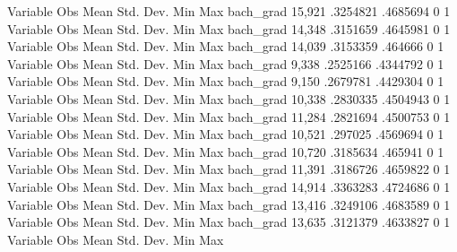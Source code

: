 {\smallskip}
    Variable {\VBAR}        Obs        Mean    Std. Dev.       Min        Max
   bach_grad {\VBAR}     15,921    .3254821    .4685694          0          1
{\smallskip}
    Variable {\VBAR}        Obs        Mean    Std. Dev.       Min        Max
   bach_grad {\VBAR}     14,348    .3151659    .4645981          0          1
{\smallskip}
    Variable {\VBAR}        Obs        Mean    Std. Dev.       Min        Max
   bach_grad {\VBAR}     14,039    .3153359     .464666          0          1
{\smallskip}
    Variable {\VBAR}        Obs        Mean    Std. Dev.       Min        Max
   bach_grad {\VBAR}      9,338    .2525166    .4344792          0          1
{\smallskip}
    Variable {\VBAR}        Obs        Mean    Std. Dev.       Min        Max
   bach_grad {\VBAR}      9,150    .2679781    .4429304          0          1
{\smallskip}
    Variable {\VBAR}        Obs        Mean    Std. Dev.       Min        Max
   bach_grad {\VBAR}     10,338    .2830335    .4504943          0          1
{\smallskip}
    Variable {\VBAR}        Obs        Mean    Std. Dev.       Min        Max
   bach_grad {\VBAR}     11,284    .2821694    .4500753          0          1
{\smallskip}
    Variable {\VBAR}        Obs        Mean    Std. Dev.       Min        Max
   bach_grad {\VBAR}     10,521     .297025    .4569694          0          1
{\smallskip}
    Variable {\VBAR}        Obs        Mean    Std. Dev.       Min        Max
   bach_grad {\VBAR}     10,720    .3185634     .465941          0          1
{\smallskip}
    Variable {\VBAR}        Obs        Mean    Std. Dev.       Min        Max
   bach_grad {\VBAR}     11,391    .3186726    .4659822          0          1
{\smallskip}
    Variable {\VBAR}        Obs        Mean    Std. Dev.       Min        Max
   bach_grad {\VBAR}     14,914    .3363283    .4724686          0          1
{\smallskip}
    Variable {\VBAR}        Obs        Mean    Std. Dev.       Min        Max
   bach_grad {\VBAR}     13,416    .3249106    .4683589          0          1
{\smallskip}
    Variable {\VBAR}        Obs        Mean    Std. Dev.       Min        Max
   bach_grad {\VBAR}     13,635    .3121379    .4633827          0          1
{\smallskip}
    Variable {\VBAR}        Obs        Mean    Std. Dev.       Min        Max
